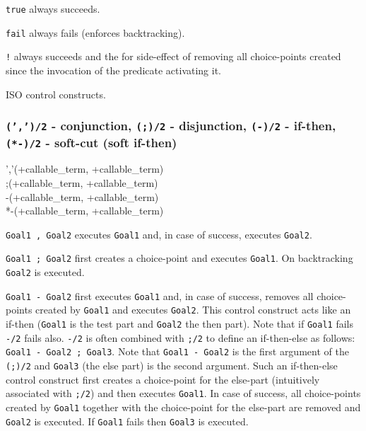 \Description

\texttt{true} always succeeds.

\texttt{fail} always fails (enforces backtracking).

\texttt{!} always succeeds and the for side-effect of removing all
choice-points created since the invocation of the predicate activating it.

\PlErrorsNone

\Portability

ISO control constructs.

\subsubsection{\texttt{(',')/2} - conjunction,
               \texttt{(;)/2} - disjunction,
               \texttt{(-{\gt})/2} - if-then,
               \texttt{(*-{\gt})/2} - soft-cut (soft if-then)}

\begin{TemplatesOneCol}
','(+callable\_term, +callable\_term)\\
;(+callable\_term, +callable\_term)\\
-{\gt}(+callable\_term, +callable\_term)\\
{*-{\gt}}(+callable\_term, +callable\_term)

\end{TemplatesOneCol}

\Description

\texttt{Goal1 , Goal2} executes \texttt{Goal1} and, in case of
success, executes \texttt{Goal2}.

\texttt{Goal1 ; Goal2} first creates a choice-point and executes
\texttt{Goal1}. On backtracking \texttt{Goal2} is executed.

\texttt{Goal1 -{\gt} Goal2} first executes \texttt{Goal1} and,
in case of success, removes all choice-points created by \texttt{Goal1} and
executes \texttt{Goal2}. This control construct acts like an if-then
(\texttt{Goal1} is the test part and \texttt{Goal2} the then part). Note that
if \texttt{Goal1} fails \texttt{-{\gt}/2} fails also. \texttt{-{\gt}/2} is
often combined with \texttt{;/2} to define an if-then-else as follows:
\texttt{Goal1 -{\gt} Goal2 ; Goal3}. Note that \texttt{Goal1 -{\gt} Goal2}
is the first argument of the \texttt{(;)/2} and \texttt{Goal3} (the else
part) is the second argument. Such an if-then-else control construct first
creates a choice-point for the else-part (intuitively associated with
\texttt{;/2}) and then executes \texttt{Goal1}. In case of success, all
choice-points created by \texttt{Goal1} together with the choice-point for
the else-part are removed and \texttt{Goal2} is executed. If \texttt{Goal1}
fails then \texttt{Goal3} is executed.

